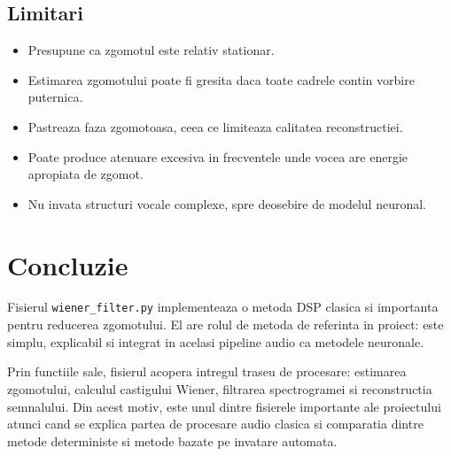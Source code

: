 \documentclass[12pt,a4paper]{report}
\begin{document}
\section{Limitari}

\begin{itemize}
    \item Presupune ca zgomotul este relativ stationar.
    \item Estimarea zgomotului poate fi gresita daca toate cadrele contin vorbire puternica.
    \item Pastreaza faza zgomotoasa, ceea ce limiteaza calitatea reconstructiei.
    \item Poate produce atenuare excesiva in frecventele unde vocea are energie apropiata de zgomot.
    \item Nu invata structuri vocale complexe, spre deosebire de modelul neuronal.
\end{itemize}

\chapter{Concluzie}

Fisierul \texttt{wiener\_filter.py} implementeaza o metoda DSP clasica si importanta pentru reducerea zgomotului. El are rolul de metoda de referinta in proiect: este simplu, explicabil si integrat in acelasi pipeline audio ca metodele neuronale.

Prin functiile sale, fisierul acopera intregul traseu de procesare: estimarea zgomotului, calculul castigului Wiener, filtrarea spectrogramei si reconstructia semnalului. Din acest motiv, este unul dintre fisierele importante ale proiectului atunci cand se explica partea de procesare audio clasica si comparatia dintre metode deterministe si metode bazate pe invatare automata.
\end{document}
